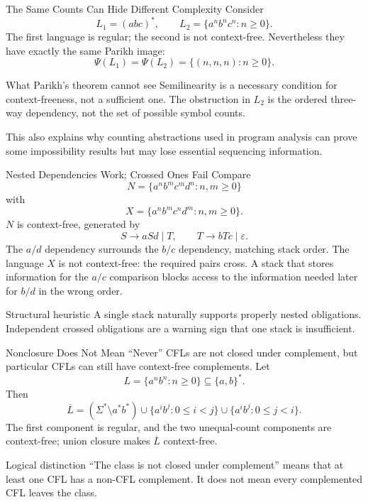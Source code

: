 \documentclass[10pt]{beamer}
\begin{document}
\begin{frame}{The Same Counts Can Hide Different Complexity}
  \small
  Consider
  \[
    L_1=(abc)^*,
    \qquad
    L_2=\{a^n b^n c^n:n\ge0\}.
  \]
  The first language is regular; the second is not context-free.
  \pause
  Nevertheless they have exactly the same Parikh image:
  \[
    \Psi(L_1)=\Psi(L_2)=\{(n,n,n):n\ge0\}.
  \]
  \pause
  \begin{alertblock}{What Parikh's theorem cannot see}
    Semilinearity is a necessary condition for context-freeness, not a
    sufficient one. The obstruction in $L_2$ is the ordered three-way
    dependency, not the set of possible symbol counts.
  \end{alertblock}
  This also explains why counting abstractions used in program analysis can
  prove some impossibility results but may lose essential sequencing
  information.
\end{frame}

\begin{frame}{Nested Dependencies Work; Crossed Ones Fail}
  \small
  Compare
  \[
    N=\{a^n b^m c^m d^n:n,m\ge0\}
  \]
  with
  \[
    X=\{a^n b^m c^n d^m:n,m\ge0\}.
  \]
  \pause
  $N$ is context-free, generated by
  \[
    S\to aSd\mid T,
    \qquad T\to bTc\mid\varepsilon.
  \]
  The $a/d$ dependency surrounds the $b/c$ dependency, matching stack order.
  \pause
  The language $X$ is not context-free: the required pairs cross. A stack
  that stores information for the $a/c$ comparison blocks access to the
  information needed later for $b/d$ in the wrong order.
  \begin{block}{Structural heuristic}
    A single stack naturally supports properly nested obligations. Independent
    crossed obligations are a warning sign that one stack is insufficient.
  \end{block}
\end{frame}

\begin{frame}{Nonclosure Does Not Mean ``Never''}
  \small
  CFLs are not closed under complement, but particular CFLs can still have
  context-free complements.
  \pause
  Let
  \[
    L=\{a^n b^n:n\ge0\}\subseteq\{a,b\}^*.
  \]
  Then
  \[
    \overline L=
    (\Sigma^*\setminus a^*b^*)
    \cup\{a^i b^j:0\le i<j\}
    \cup\{a^i b^j:0\le j<i\}.
  \]
  The first component is regular, and the two unequal-count components are
  context-free; union closure makes $\overline L$ context-free.
  \pause
  \begin{alertblock}{Logical distinction}
    ``The class is not closed under complement'' means that at least one CFL
    has a non-CFL complement. It does not mean every complemented CFL leaves
    the class.
  \end{alertblock}
\end{frame}
\end{document}
